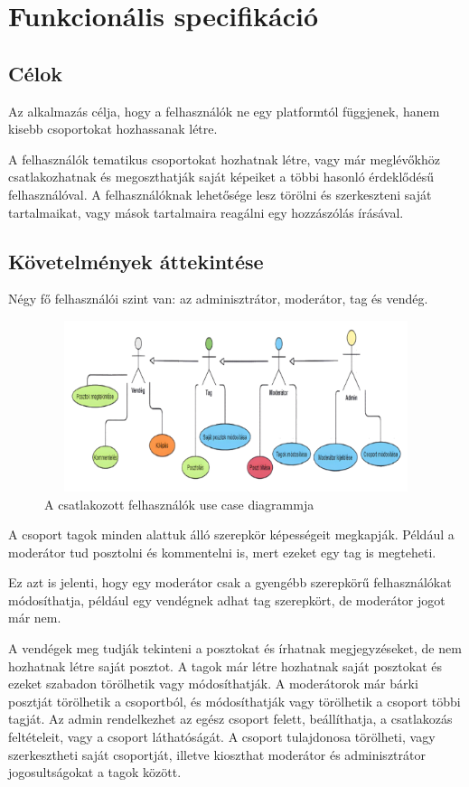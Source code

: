 \documentclass[
]{thesis-ekf}
\theoremstyle{definition}
\theoremstyle{remark}
\begin{document}
\section{Funkcionális specifikáció}

\subsection{Célok}

Az alkalmazás célja, hogy a felhasználók ne egy platformtól függjenek, hanem kisebb csoportokat hozhassanak létre.

A felhasználók tematikus csoportokat hozhatnak létre, vagy már meglévőkhöz csatlakozhatnak és megoszthatják saját képeiket a többi hasonló érdeklődésű felhasználóval. A felhasználóknak lehetősége lesz törölni és szerkeszteni saját tartalmaikat, vagy mások tartalmaira reagálni egy hozzászólás írásával.

\subsection{Követelmények áttekintése}

Négy fő felhasználói szint van: az adminisztrátor, moderátor, tag és vendég.

\begin{figure}[H]
	\centering
	\includegraphics[width=15cm, height=5cm]{model_2}
	\caption{A csatlakozott felhasználók use case diagrammja}
	\label{fig:picture}
\end{figure}

A csoport tagok minden alattuk álló szerepkör képességeit megkapják. Például a moderátor tud posztolni és kommentelni is, mert ezeket egy tag is megteheti.

Ez azt is jelenti,  hogy egy moderátor csak a gyengébb szerepkörű felhasználókat módosíthatja, például egy vendégnek adhat tag szerepkört, de moderátor jogot már nem.

A vendégek meg tudják tekinteni a posztokat és írhatnak megjegyzéseket, de nem hozhatnak létre saját posztot. A tagok már létre hozhatnak saját posztokat és ezeket szabadon törölhetik vagy módosíthatják. A moderátorok már bárki posztját törölhetik a csoportból, és módosíthatják vagy törölhetik a csoport többi tagját. Az admin rendelkezhet az egész csoport felett, beállíthatja, a csatlakozás feltételeit, vagy a csoport láthatóságát. A csoport tulajdonosa törölheti, vagy szerkesztheti saját csoportját, illetve kioszthat moderátor és adminisztrátor jogosultságokat a tagok között.
\end{document}
